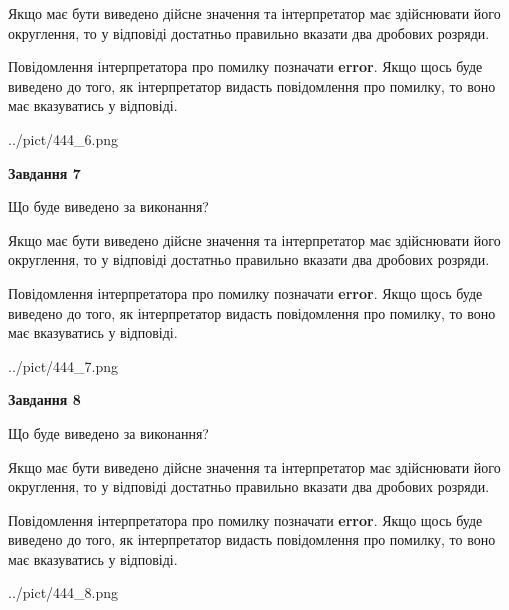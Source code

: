 \documentclass[12pt, ukrainian]{article}
\begin{document}
{\begin {Large}
Якщо має бути виведено дійсне значення та інтерпретатор має здійснювати його округлення, 
то у відповіді достатньо правильно вказати два дробових розряди.

Повідомлення інтерпретатора про помилку позначати \textbf{error}.
Якщо щось буде виведено до того, як інтерпретатор видасть повідомлення про помилку, 
то воно має вказуватись у відповіді. \par

\begin{center}
	{../pict/444_6.png}
\end{center}
\newpage

{\begin {center}\textbf{Завдання 7}\end {center}}\par
Що буде виведено за виконання? \par

Якщо має бути виведено дійсне значення та інтерпретатор має здійснювати його округлення, 
то у відповіді достатньо правильно вказати два дробових розряди.

Повідомлення інтерпретатора про помилку позначати \textbf{error}.
Якщо щось буде виведено до того, як інтерпретатор видасть повідомлення про помилку, 
то воно має вказуватись у відповіді. \par

\begin{center}
	{../pict/444_7.png}
\end{center}
\newpage

{\begin {center}\textbf{Завдання 8}\end {center}}\par
Що буде виведено за виконання? \par

Якщо має бути виведено дійсне значення та інтерпретатор має здійснювати його округлення, 
то у відповіді достатньо правильно вказати два дробових розряди.

Повідомлення інтерпретатора про помилку позначати \textbf{error}.
Якщо щось буде виведено до того, як інтерпретатор видасть повідомлення про помилку, 
то воно має вказуватись у відповіді. \par

\begin{center}
	{../pict/444_8.png}
\end{center}
\newpage


\end{Large}}
\end{document}
